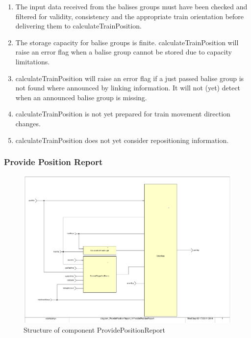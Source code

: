 \begin{itemize}
\begin{enumerate}
\item The input data received from the balises groups must have been checked and filtered for validity, consistency and the appropriate train orientation before delivering them to calculateTrainPosition. 
\item The storage capacity for balise groups is finite. calculateTrainPosition will raise an error flag when a balise group cannot be stored due to capacity limitations.
\item calculateTrainPosition will raise an error flag if a just passed balise group is not found where announced by linking information. It will not (yet) detect when an announced balise group is missing. 
\item calculateTrainPosition is not yet prepared for train movement direction changes. 
\item calculateTrainPosition does not yet consider repositioning information.
\end{enumerate}

\end{itemize}

\subsubsection{Provide Position Report}\label{sss:provposrep}

\begin{figure}[ht]
\centering
\includegraphics[scale=0.6]{../images/ProvidePositionReport.pdf}
\caption{Structure of component ProvidePositionReport}\label{fig:provideposrep}
\end{figure}

